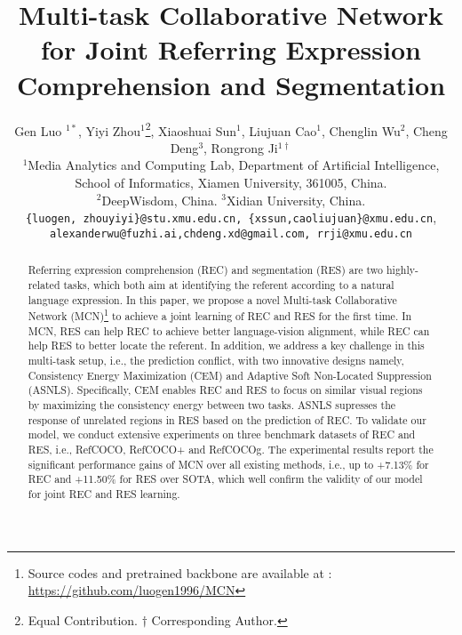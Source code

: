 \documentclass[10pt,twocolumn,letterpaper]{article}
\begin{document}
\title{Multi-task Collaborative  Network for Joint  Referring Expression Comprehension and Segmentation}

\author{
	Gen Luo $^{1*}$,
	Yiyi Zhou$^{1}$\thanks{Equal Contribution. $\dagger$ Corresponding Author.},
	Xiaoshuai Sun$^{1}$,
	Liujuan Cao$^{1}$,
	Chenglin Wu$^{2}$,
	Cheng Deng$^{3}$,
	Rongrong Ji$^{1\dagger}$
	 \\
	$^1$Media Analytics and Computing Lab, Department of Artificial Intelligence,\\
	School of Informatics, Xiamen University, 361005, China.\\
	$^2$DeepWisdom, China.
	$^3$Xidian University, China.
	   \\	
	{\tt\small \{luogen, zhouyiyi\}@stu.xmu.edu.cn, \{xssun,caoliujuan\}@xmu.edu.cn},\\
	{\tt\small alexanderwu@fuzhi.ai,chdeng.xd@gmail.com, rrji@xmu.edu.cn}\\
}

\maketitle
\thispagestyle{empty}

\begin{abstract}
	Referring expression comprehension (REC) and segmentation (RES) are two highly-related tasks, which both aim at identifying the referent according to a natural language expression. 
	In this paper, we propose a novel Multi-task Collaborative Network (MCN)\footnote{Source codes and pretrained backbone are available at : \url{https://github.com/luogen1996/MCN}} to achieve a joint learning of REC and RES for the first time.
	In MCN,  RES can help REC to achieve better language-vision alignment, while REC can help RES to  better locate the referent.
	In addition, we address a key challenge in this  multi-task setup, i.e., the prediction conflict, with two innovative designs namely,   Consistency Energy Maximization (CEM) and Adaptive Soft Non-Located Suppression (ASNLS). 
	Specifically, CEM enables  REC and RES  to focus  on similar visual regions by maximizing the consistency energy between  two tasks.  ASNLS  supresses the response of unrelated regions in RES based on the prediction of REC. 
	To validate our model, we conduct extensive experiments on three benchmark datasets of REC and RES, i.e., RefCOCO, RefCOCO+ and RefCOCOg. 
	The experimental results report   the significant  performance gains of MCN over all  existing methods, i.e., up to +7.13\% for REC and +11.50\% for RES over SOTA, which  well confirm the validity of our model  for  joint REC and RES learning.
\end{abstract}
\end{document}
